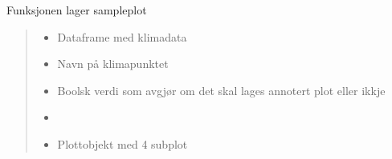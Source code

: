 \documentclass[letterpaper,10pt,norsk]{sphinxmanual}
\begin{document}

\begin{fulllineitems}
\label{\detokenize{index:klimadata.plot.klimaoversikt}}
\pysigstartsignatures
{}
\pysigstopsignatures
\sphinxAtStartPar
Funksjonen lager sampleplot
\begin{quote}\begin{description}
\begin{itemize}
\item {} 
\sphinxAtStartPar
{} \textendash{} Dataframe med klimadata

\item {} 
\sphinxAtStartPar
{} \textendash{} Navn på klimapunktet

\item {} 
\sphinxAtStartPar
{} \textendash{} Boolsk verdi som avgjør om det skal lages annotert plot eller ikkje

\item {} 
\sphinxAtStartPar
{} \textendash{} 

\item {} 
\sphinxAtStartPar
\sphinxstyleliteralstrong{\sphinxupquote{\sphinxhyphen{}\sphinxhyphen{}\sphinxhyphen{}\sphinxhyphen{}\sphinxhyphen{}\sphinxhyphen{}\sphinxhyphen{}}} \textendash{} \begin{description}
\sphinxAtStartPar
Plott\sphinxhyphen{}objekt med 4 subplot

\end{description}


\end{itemize}

\end{description}\end{quote}

\end{fulllineitems}

\end{document}

